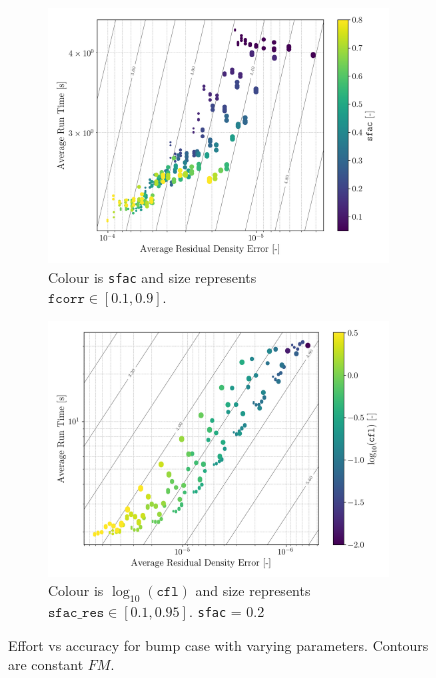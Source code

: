 \documentclass{article}
\begin{document}
\begin{figure}[H]
    \begin{subfigure}{0.49\textwidth}
        \centering
        \includegraphics[width=0.99\textwidth]{figures/effort_vs_accuracy_fcorr.png}
        \caption{Colour is \texttt{sfac} and size represents \\ $\texttt{fcorr} \in [0.1, 0.9]$. }
        \label{fig:effort_vs_accuracy_fcorr}
    \end{subfigure}
    \begin{subfigure}{0.49\textwidth}
        \centering
        \includegraphics[width=0.99\textwidth]{figures/effort_vs_accuracy_sfac_res.png}
        \caption{Colour is $\log_{10}( \texttt{cfl})$ and size represents \\ $\texttt{sfac\_res} \in [0.1,0.95]$. \texttt{sfac} = 0.2}
        \label{fig:effort_vs_accuracy_sfac_res}
    \end{subfigure}
    \caption{Effort vs accuracy for bump case with varying parameters. Contours are constant $FM$.}
    \label{fig:effort_vs_accuracy_2}
\end{figure}
\end{document}
